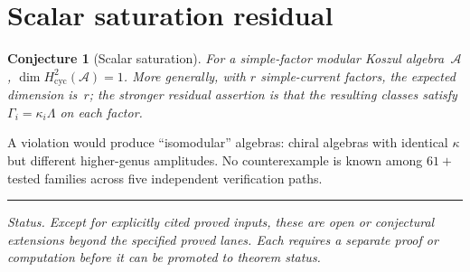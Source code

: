 \documentclass[11pt]{amsart}
\newcommand{\cA}{\mathcal{A}}
\theoremstyle{plain}
\newtheorem{conjecture}[theorem]{Conjecture}
\theoremstyle{definition}
\theoremstyle{remark}
\begin{document}
\section{Scalar saturation residual}

\begin{conjecture}[Scalar saturation]
For a simple-factor modular Koszul algebra~$\cA$,
$\dim H^2_{\mathrm{cyc}}(\cA) = 1$.  More generally, with
$r$ simple-current factors, the expected dimension is~$r$; the
stronger residual assertion is that the resulting classes satisfy
$\Gamma_i=\kappa_i\Lambda$ on each factor.
\end{conjecture}

A violation would produce ``isomodular'' algebras: chiral
algebras with identical $\kappa$ but different higher-genus
amplitudes. No counterexample is known among $61+$ tested
families across five independent verification paths.

\bigskip
\hrule
\bigskip

\noindent\textit{Status.  Except for explicitly cited proved inputs,
these are open or conjectural extensions beyond the specified proved
lanes.  Each requires a separate proof or computation before it can
be promoted to theorem status.}
\end{document}
